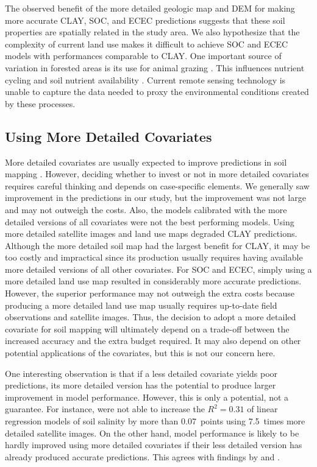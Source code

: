 The observed benefit of the more detailed geologic map and DEM for making more accurate CLAY, SOC, and ECEC 
predictions suggests that these soil properties are spatially related in the study area. We also hypothesize 
that the complexity of current land use makes it difficult to achieve SOC and ECEC models with performances 
comparable to CLAY. One important source of variation in forested areas is its use for animal grazing 
\cite{SamuelRosaEtAl2011a}. This influences nutrient cycling and soil nutrient availability 
\cite{SchramaEtAl2013}. Current remote sensing technology is unable to capture the data needed to proxy the 
environmental conditions created by these processes.

\subsection{Using More Detailed Covariates}

More detailed covariates are usually expected to improve predictions in soil mapping \cite{CavazziEtAl2013, 
MaynardEtAl2014}. However, deciding whether to invest or not in more detailed covariates requires careful 
thinking and depends on case-specific elements. We generally saw improvement in the predictions in our study, 
but the improvement was not large and may not outweigh the costs. Also, the models calibrated with the more 
detailed versions of all covariates were not the best performing models. Using more detailed satellite images 
and land use maps degraded CLAY predictions. Although the more detailed soil map had the largest benefit for 
CLAY, it may be too costly and impractical since its production usually requires having available more 
detailed versions of all other covariates. For SOC and ECEC, simply using a more detailed land use map 
resulted in considerably more accurate predictions. However, the superior performance may not outweigh the 
extra costs because producing a more detailed land use map usually requires up-to-date field observations and 
satellite images. Thus, the decision to adopt a more detailed covariate for soil mapping will ultimately 
depend on a trade-off between the increased accuracy and the extra budget required. It may also depend on 
other potential applications of the covariates, but this is not our concern here.

One interesting observation is that if a less detailed covariate yields poor predictions, its more detailed 
version has the potential to produce larger improvement in model performance. However, this is only a 
potential, not a guarantee. For instance, \citet{EldeiryEtAl2008} were not able to increase the $R^2 = 
0.31$ of linear regression models of soil salinity by more than \num{0.07}~points using \num{7.5}~times more 
detailed satellite images. On the other hand, model performance is likely to be hardly improved using more 
detailed covariates if their less detailed version has already produced accurate predictions. This agrees with 
findings by \citet{ThompsonEtAl2001} and \citet{KimEtAl2014}.

